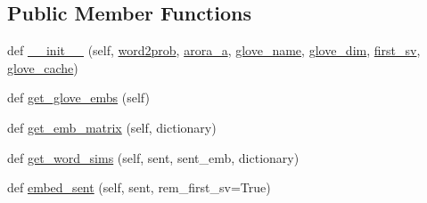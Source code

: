 \subsection*{Public Member Functions}
\begin{DoxyCompactItemize}
\item 
def \hyperlink{classprojects_1_1controllable__dialogue_1_1controllable__seq2seq_1_1arora_1_1SentenceEmbedder_a13f8aaf805cdc6f2f875855aebed359f}{\+\_\+\+\_\+init\+\_\+\+\_\+} (self, \hyperlink{classprojects_1_1controllable__dialogue_1_1controllable__seq2seq_1_1arora_1_1SentenceEmbedder_ad68b7ff40fc3cda4bf7305e1d15ae906}{word2prob}, \hyperlink{classprojects_1_1controllable__dialogue_1_1controllable__seq2seq_1_1arora_1_1SentenceEmbedder_a2aa3fa103744f074307494ba97365a5d}{arora\+\_\+a}, \hyperlink{classprojects_1_1controllable__dialogue_1_1controllable__seq2seq_1_1arora_1_1SentenceEmbedder_abced90ecdc0f9a4c19de5c1a7b509419}{glove\+\_\+name}, \hyperlink{classprojects_1_1controllable__dialogue_1_1controllable__seq2seq_1_1arora_1_1SentenceEmbedder_a9cc6cebd256bd19e4ef5cb57b89df249}{glove\+\_\+dim}, \hyperlink{classprojects_1_1controllable__dialogue_1_1controllable__seq2seq_1_1arora_1_1SentenceEmbedder_ad9e25aac54c7d5676eeafb7ccafb74b8}{first\+\_\+sv}, \hyperlink{classprojects_1_1controllable__dialogue_1_1controllable__seq2seq_1_1arora_1_1SentenceEmbedder_a18ad711127a09118e5bad2e7c1edd8c2}{glove\+\_\+cache})
\item 
def \hyperlink{classprojects_1_1controllable__dialogue_1_1controllable__seq2seq_1_1arora_1_1SentenceEmbedder_a0dbbf6fae437b5b191e2cd74214b5386}{get\+\_\+glove\+\_\+embs} (self)
\item 
def \hyperlink{classprojects_1_1controllable__dialogue_1_1controllable__seq2seq_1_1arora_1_1SentenceEmbedder_ae186abd172ba556f285e245388bbe806}{get\+\_\+emb\+\_\+matrix} (self, dictionary)
\item 
def \hyperlink{classprojects_1_1controllable__dialogue_1_1controllable__seq2seq_1_1arora_1_1SentenceEmbedder_aec75badae47460e90dbb704867ac7279}{get\+\_\+word\+\_\+sims} (self, sent, sent\+\_\+emb, dictionary)
\item 
def \hyperlink{classprojects_1_1controllable__dialogue_1_1controllable__seq2seq_1_1arora_1_1SentenceEmbedder_aea0dbc0848f20665f18c7aabc737ce7f}{embed\+\_\+sent} (self, sent, rem\+\_\+first\+\_\+sv=True)
\end{DoxyCompactItemize}

